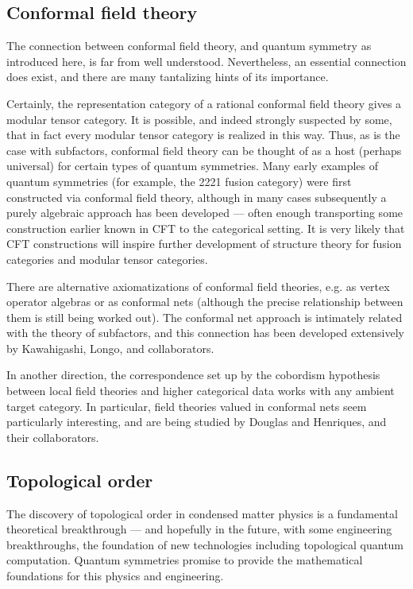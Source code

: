 \documentclass[12pt]{article}
\begin{document}
\subsection{Conformal field theory}
The connection between conformal field theory, and quantum symmetry as introduced here, is far from well understood. Nevertheless, an essential connection does exist, and there are many tantalizing hints of its importance.

Certainly, the representation category of a rational conformal field theory gives a modular tensor category. It is possible, and indeed strongly suspected by some, that in fact every modular tensor category is realized in this way.
Thus, as is the case with subfactors, conformal field theory can be thought of
as a host (perhaps universal) for certain types of quantum symmetries. Many early examples of quantum symmetries (for example, the 2221 fusion category) were first constructed via conformal field theory, although in many cases subsequently a purely algebraic approach has been developed --- often enough
transporting some construction earlier known in CFT to the categorical
setting. It is very likely that CFT constructions will inspire further
development of structure theory for fusion categories and modular tensor
categories.

There are alternative axiomatizations of conformal field theories, e.g.  as
vertex operator algebras or as conformal nets (although the precise
relationship between them is still being worked out). The conformal net
approach is intimately related with the theory of subfactors, and this connection has been developed extensively by Kawahigashi, Longo, and collaborators.

In another direction, the correspondence set up by the cobordism hypothesis between local field theories and higher categorical data works with any ambient target category. In particular, field theories valued in conformal nets seem particularly interesting, and are being studied by Douglas and Henriques, and their collaborators.


\subsection{Topological order}
The discovery of topological order in condensed matter physics is a
fundamental theoretical breakthrough --- and hopefully in the future, with
some engineering breakthroughs, the foundation of new technologies including
topological quantum computation. Quantum symmetries promise to provide the
mathematical foundations for this physics and engineering.
\end{document}
